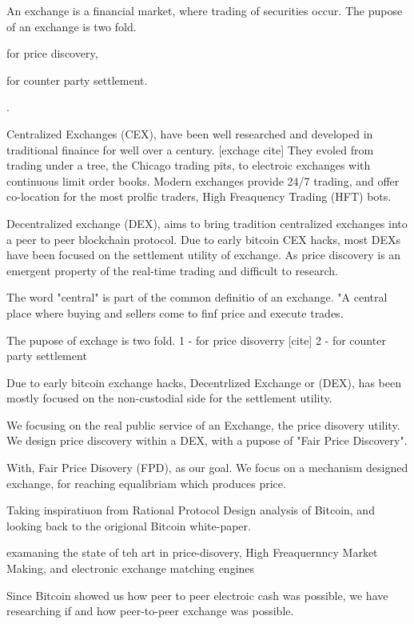 \documentclass[12pt]{article}
\begin{document}
An exchange is a financial market, where trading of securities occur. The pupose of an exchange is two fold. \begin {enumerate*} [1) ]%
\item for price discovery, \item for counter party settlement. \end {enumerate*}. 

Centralized Exchanges (CEX), have been well researched and developed in traditional finaince for well over a century. [exchage cite] They  evoled from trading under a tree, the Chicago trading pits, to electroic exchanges with continuous limit order books. Modern exchanges provide 24/7 trading, and offer co-location for the most prolfic traders, High Freaquency Trading (HFT) bots. 

Decentralized exchange (DEX), aims to bring tradition centralized exchanges into a peer to peer blockchain protocol. Due to early bitcoin CEX hacks, most DEXs have been focused on the settlement utility of exchange. As price discovery is an emergent property of the real-time trading and difficult to research. 

 
The word "central" is part of the common definitio of an exchange. "A central place where buying and sellers come to finf price and execute trades. 

The pupose of exchage is two fold. 1 - for price disoverry [cite]  2 - for counter party settlement 

Due to early bitcoin exchange hacks, Decentrlized Exchange or (DEX), has been mostly focused on the non-custodial side for the settlement utility. 
 
We focusing on the real public service of an Exchange, the price disovery utility. We design price discovery within a DEX, with a pupose of "Fair Price Discovery". 

With, Fair Price Disovery (FPD), as our goal. We focus on a mechanism designed exchange, for reaching equalibriam which produces price. 

Taking inspiratiuon from Rational Protocol Design analysis of Bitcoin, and looking back to the origional Bitcoin white-paper. 


examaning the state of teh art in price-disovery, High Freaquernncy Market Making, and electronic exchange matching engines  

Since Bitcoin showed us how peer to peer electroic cash was possible, we have researching if and how peer-to-peer exchange was possible. 
\end{document}

